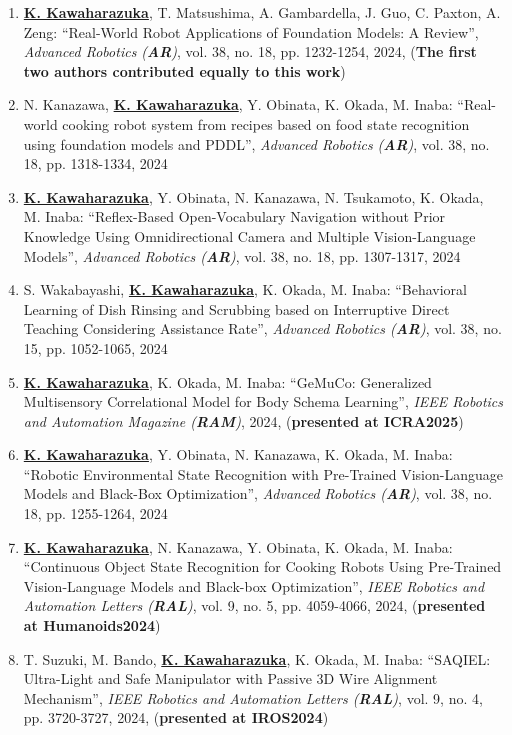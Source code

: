 \documentclass[letterpaper]{article}
\begin{document}
\begin{enumerate}
\item \underline{\textbf{K. Kawaharazuka}}, T. Matsushima, A. Gambardella, J. Guo, C. Paxton, A. Zeng: ``Real-World Robot Applications of Foundation Models: A Review'', \textit{Advanced Robotics (\textit{\textbf{AR}})}, vol. 38, no. 18, pp. 1232-1254, 2024, (\textbf{The first two authors contributed equally to this work})
\item N. Kanazawa, \underline{\textbf{K. Kawaharazuka}}, Y. Obinata, K. Okada, M. Inaba: ``Real-world cooking robot system from recipes based on food state recognition using foundation models and PDDL'', \textit{Advanced Robotics (\textit{\textbf{AR}})}, vol. 38, no. 18, pp. 1318-1334, 2024
\item \underline{\textbf{K. Kawaharazuka}}, Y. Obinata, N. Kanazawa, N. Tsukamoto, K. Okada, M. Inaba: ``Reflex-Based Open-Vocabulary Navigation without Prior Knowledge Using Omnidirectional Camera and Multiple Vision-Language Models'', \textit{Advanced Robotics (\textit{\textbf{AR}})}, vol. 38, no. 18, pp. 1307-1317, 2024
\item S. Wakabayashi, \underline{\textbf{K. Kawaharazuka}}, K. Okada, M. Inaba: ``Behavioral Learning of Dish Rinsing and Scrubbing based on Interruptive Direct Teaching Considering Assistance Rate'', \textit{Advanced Robotics (\textit{\textbf{AR}})}, vol. 38, no. 15, pp. 1052-1065, 2024
\item \underline{\textbf{K. Kawaharazuka}}, K. Okada, M. Inaba: ``GeMuCo: Generalized Multisensory Correlational Model for Body Schema Learning'', \textit{IEEE Robotics and Automation Magazine (\textit{\textbf{RAM}})}, 2024, (\textbf{presented at ICRA2025})
\item \underline{\textbf{K. Kawaharazuka}}, Y. Obinata, N. Kanazawa, K. Okada, M. Inaba: ``Robotic Environmental State Recognition with Pre-Trained Vision-Language Models and Black-Box Optimization'', \textit{Advanced Robotics (\textit{\textbf{AR}})}, vol. 38, no. 18, pp. 1255-1264, 2024
\item \underline{\textbf{K. Kawaharazuka}}, N. Kanazawa, Y. Obinata, K. Okada, M. Inaba: ``Continuous Object State Recognition for Cooking Robots Using Pre-Trained Vision-Language Models and Black-box Optimization'', \textit{IEEE Robotics and Automation Letters (\textit{\textbf{RAL}})}, vol. 9, no. 5, pp. 4059-4066, 2024, (\textbf{presented at Humanoids2024})
\item T. Suzuki, M. Bando, \underline{\textbf{K. Kawaharazuka}}, K. Okada, M. Inaba: ``SAQIEL: Ultra-Light and Safe Manipulator with Passive 3D Wire Alignment Mechanism'', \textit{IEEE Robotics and Automation Letters (\textit{\textbf{RAL}})}, vol. 9, no. 4, pp. 3720-3727, 2024, (\textbf{presented at IROS2024})

\end{enumerate}
\end{document}
